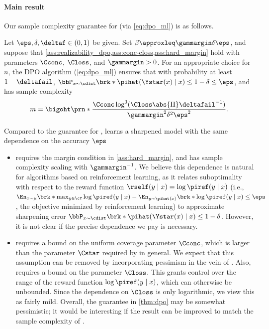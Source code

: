 \paragraph{Main result}
Our sample complexity guarantee for \rlhfalg (via \cref{eq:dpo_ml})
is as follows.\loose
      \begin{theorem}
        \label{thm:dpo}
        Let $\eps,\delta,\deltaf\in(0,1)$ be given. Set
        $\beta\approxleq\gammargin\delta\eps$, and suppose that
        \cref{ass:realizability_dpo,ass:conc-closs,ass:hard_margin} hold with parameters
        $\Cconc$, $\Closs$, and $\gammargin>0$. For an appropriate
        choice for $n$, the DPO algorithm (\cref{eq:dpo_ml}) ensures that with
        probability at least $1-\deltafail$, $                    \bbP_{x\sim\cdist}\brk*{\pihat(\Ystar(x)\mid{}x)\leq{}1-\delta}
        \leq \eps$, and has sample complexity
       \begin{align}
          m = \bigoht\prn*{\frac{\Cconc\log^{3}(\Closs\abs{\Pi}\deltafail^{-1})}{\gammargin^2\delta^2\eps^2}}.
        \end{align}
      \end{theorem}
Compared to the guarantee for \bestofnalg, \rlhfalg learns
a sharpened model with 
the same dependence on the accuracy $\eps$
\begin{itemize}
  \item \rlhfalg requires the margin condition in
  \cref{ass:hard_margin}, and has sample complexity scaling with
  $\gammargin^{-1}$. We believe this dependence is natural for
  algorithms based on reinforcement learning, as it relates suboptimality with respect to the reward
  function $\rself(y\mid{}x)=\log\piref(y\mid{}x)$ (i.e.,
  $\En_{x\sim\mu}\brk*{\max_{y\in\cY}\log\piref(y\mid{}x)-\En_{y\sim\pihat(x)}\brk*{\log\piref(y\mid{}x)}}\leq\eps$,
  the objective minimized by reinforcement learning)
  to approximate sharpening error $\bbP_{x\sim\cdist}\brk*{\pihat(\Ystar(x)\mid{}x)\leq{}1-\delta}$. However, it is not clear if the precise dependence we pay is necessary. %
\item \rlhfalg requires a bound on the uniform coverage parameter
  $\Cconc$, which is larger than the parameter $\Cstar$ required by
  \bestofnalg in general. We expect that this assumption can be
  removed by incorporating pessimism in the vein of
  \citep{liu2024provably,huang2024correcting}. Also,
  \rlhfalg requires a bound on the parameter $\Closs$. This grants
  control over the range of the reward function
  $\log\piref(y\mid{}x)$, which can otherwise be unbounded. Since the
  dependence on $\Closs$ is only logarithmic, we view this as fairly
  mild. Overall, the guarantee in \cref{thm:dpo} may be somewhat
  pessimistic; it would be interesting if the result can be improved %
  to match the sample complexity
  of \bestofnalg.
\end{itemize}

